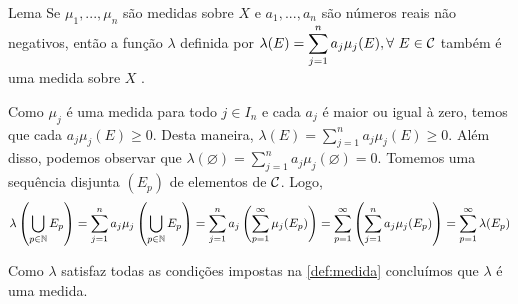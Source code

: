 \begin{env}{Lema}
	\label{lem:medida-gerada-por-medidas-e-numeros-reais}
	Se $\mu_1, ..., \mu_n$ são medidas sobre $X$ e $a_1, ... , a_n$ são números reais não negativos, então a função $\lambda$ definida por
	$\lambda(E) = \displaystyle \sum_{j =1}^n a_j\mu_j(E), \forall\  E \in \operatorname{\mathcal{C}}$ também é uma medida sobre $X$  \cite{bartle}.
\end{env}
\begin{prova}
	Como $\mu_j$ é uma medida para todo $j \in I_n$ e cada $a_j$ é maior ou igual à zero, temos que cada $a_j\mu_j(E) \geq 0$.
	Desta maneira, $\lambda(E) = \displaystyle \sum_{j = 1}^n a_j\mu_j(E) \geq 0$.
	Além disso, podemos observar que $\lambda(\varnothing) = \displaystyle \sum_{j =1}^n a_j\mu_j(\varnothing) = 0$.
	Tomemos uma sequência disjunta $(E_p)$ de elementos de $\operatorname{\mathcal{C}}$.
	Logo, 
	$$
	\lambda\left(\bigcup_{p \in \operatorname{\mathbb{N}}} E_p\right)
	=
	\sum_{j = 1}^n a_j\mu_j\left(\bigcup_{p \in \operatorname{\mathbb{N}}} E_p\right)
	=
	\sum_{j = 1}^n a_j\left(\sum_{p = 1}^\infty\mu_j(E_p)\right)
	=
	\sum_{p = 1}^\infty\left(\sum_{j = 1}^na_j\mu_j(E_p)\right)
	=
	\sum_{p = 1}^{\infty}\lambda(E_p)
	$$
	\begin{comment}
	Afirmamos que $\displaystyle \sum_{j = 1}^n a_j\left(\sum_{p = 1}^\infty\mu_j(E_p)\right) = \sum_{p = 1}^\infty\left(\sum_{j = 1}^na_j\mu_j(E_p)\right)$.
	Com efeito, 
	\begin{align*}
	\sum_{j = 1}^n a_j\left(\sum_{p = 1}^\infty\mu_j(E_p)\right)
	= &
	\sum_{j = 1}^n a_j\left(\lim_{m \to +\infty}\sum_{p = 1}^m\mu_j(E_p)\right)\\
	= &
	\lim_{m \to +\infty}\left[\sum_{j = 1}^n a_j\left(\sum_{p = 1}^m\mu_j(E_p)\right)\right]\\
	= &
	\lim_{m \to +\infty}\left[a_1\left(\sum_{p = 1}^m\mu_1(E_p)\right)+ \cdots + a_n\left(\sum_{p = 1}^m\mu_n(E_p)\right)\right]\\
	= &
	\lim_{m \to +\infty}\left(\sum_{p = 1}^ma_1\mu_1(E_p)+ \cdots + \sum_{p = 1}^ma_n\mu_n(E_p)\right)\\
	= &
	\lim_{m \to +\infty}\sum_{p = 1}^m \left(a_1\mu_1(E_p)+ \cdots + a_n\mu_n(E_p)\right)\\
	= &
	\lim_{m \to +\infty}\sum_{p = 1}^m \left(\sum_{j = 1}^na_j\mu_j(E_p)\right)\\
	= &
	\sum_{p = 1}^\infty \left(\sum_{j = 1}^na_j\mu_j(E_p)\right)\\
\end{align*}		
	\end{comment}
	
\begin{comment}
		Disso tudo, obtemos que 
	$$
	\lambda\left(\bigcup_{p \in \N} E_p\right)
	=
	\sum_{j = 1}^n a_j\left(\sum_{p = 1}^\infty\mu_j(E_p)\right)
	=
	\sum_{p = 1}^\infty \left(\sum_{j = 1}^na_j\mu_j(E_p)\right)
	=
	\sum_{p = 1}^\infty \lambda(E_p)
	$$
\end{comment}

	Como $\lambda$ satisfaz todas as condições impostas na  \ref{def:medida} concluímos que $\lambda$ é uma medida.    
\end{prova}

